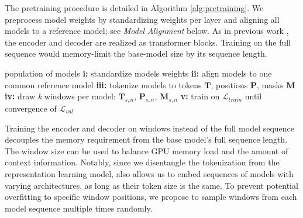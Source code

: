 The pretraining procedure is detailed in Algorithm \ref{alg:pretraining}. 
We preprocess model weights by standardizing weights per layer and aligning all models to a reference model; see \textit{Model Alignment} below.
As in previous work \citep{schurholtSelfSupervisedRepresentationLearning2021,peeblesLearningLearnGenerative2022}, 
the encoder and decoder are realized as transformer blocks. 
Training on the full sequence would memory-limit the base-model size by its sequence length.
\begin{algorithm}[]
   \caption{\ourmethod pretraining}
   \label{alg:pretraining}
\begin{algorithmic}
     population of models
    \STATE \textbf{i:} standardize models weights
    \STATE \textbf{ii:} align models to one common reference model
    \STATE \textbf{iii:} tokenize models to tokens $\mathbf{T}$, positions $\mathbf{P}$, masks $\mathbf{M}$
    \STATE \textbf{iv:} draw \textit{k} windows per model: $\mathbf{T}_{s,n}$, $\mathbf{P}_{s,n}$,  $\mathbf{M}_{s,n}$
    \STATE \textbf{v:} train on $\mathcal{L}_{train}$ until convergence of $\mathcal{L}_{val}$
\end{algorithmic}
\end{algorithm}
Training the encoder and decoder on windows instead of the full model sequence decouples the memory requirement from the base model's full sequence length. 
The window size can be used to balance GPU memory load and the amount of context information.
Notably, since we disentangle the tokenization from the representation learning model, \ourmethod also allows us to embed sequences of models with varying architectures, as long as their token size is the same. 
To prevent potential overfitting to specific window positions, we propose to sample windows from each model sequence multiple times randomly. 


